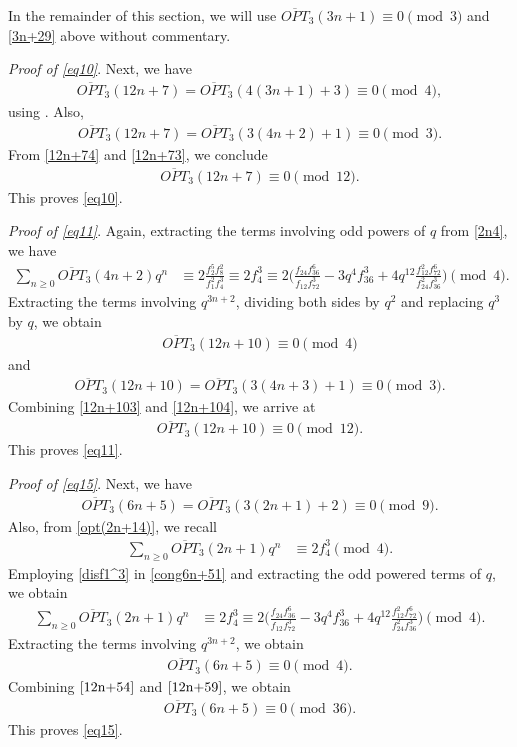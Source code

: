 \documentclass[12pt,reqno]{amsart}
\numberwithin{equation}{section}
\newcommand{\opt}{\overline{OPT}}
\begin{document}
In the remainder of this section, we will use $\opt_3(3n+1) \equiv 0\pmod{3}$ and \eqref{3n+29} above without commentary.

\emph{Proof of \eqref{eq10}}. Next, we have 
\begin{align}
    \opt_3(12n+7) = \opt_3(4(3n+1)+3) \equiv 0 \pmod{4},\label{12n+74}
\end{align}
using \cite[Theorem 1]{SSS}.
Also, 
\begin{align}
    \opt_3(12n+7) = \opt_3(3(4n+2)+1) \equiv 0 \pmod{3}.\label{12n+73}
\end{align}
From \eqref{12n+74} and \eqref{12n+73}, we conclude
\begin{align*}
     \opt_3(12n+7) \equiv 0 \pmod{12}.
\end{align*}
This proves \eqref{eq10}.

\emph{Proof of \eqref{eq11}}. Again, extracting the terms involving odd powers of $q$ from \eqref{2n4}, we have
\begin{align*}
     \sum_{n\geq 0}\opt_3(4n+2)q^n &\equiv 2\frac{f_{2}^5f_{8}^2}{f_{1}^2f_{4}^3}\equiv 2f_{4}^3 \equiv 2\Bigg(\frac{f_{24}f_{36}^6}{f_{12}f_{72}^3}-3q^4f_{36}^3+4q^{12} \frac{f_{12}^2f_{72}^6}{f_{24}^2f_{36}^3}\Bigg) \pmod{4}.
\end{align*}
Extracting the terms involving $q^{3n+2}$, dividing both sides by $q^2$ and replacing $q^3$ by $q$, we obtain
\begin{align}
    \opt_3(12n+10) \equiv 0 \pmod{4}\label{12n+104}
\end{align}
and 
\begin{align}
    \opt_3(12n+10) = \opt_3(3(4n+3)+1) \equiv 0 \pmod{3}. \label{12n+103}
\end{align}
Combining \eqref{12n+103} and \eqref{12n+104}, we arrive at
\begin{align*}
     \opt_3(12n+10) \equiv 0 \pmod{12}.
\end{align*}
This proves \eqref{eq11}.

\emph{Proof of \eqref{eq15}}. Next, we have
\begin{align}
    \opt_3(6n+5) = \opt_3(3(2n+1)+2) \equiv 0 \pmod{9}.\label{12n+59}
\end{align}
Also, from \eqref{opt(2n+14)}, we recall
\begin{align}
     \sum_{n\geq 0}\opt_3(2n+1)q^n &\equiv 2 f_{4}^3 \pmod{4}.\label{cong6n+51}
\end{align}
Employing  \eqref{disf1^3} in \eqref{cong6n+51} and extracting the odd powered terms of $q$, we obtain
\begin{align*}
         \sum_{n\geq 0}\opt_3(2n+1)q^n &\equiv 2 f_{4}^3 \equiv 2 \Bigg(\frac{f_{24}f_{36}^6}{f_{12}f_{72}^3}-3q^4f_{36}^3+4q^{12} \frac{f_{12}^2f_{72}^6}{f_{24}^2f_{36}^3}\Bigg) \pmod{4}.
\end{align*}
Extracting the terms involving $q^{3n+2}$, we obtain
\begin{align}
    \opt_3(6n+5) \equiv 0 \pmod{4}.\label{12n+54}
\end{align}
Combining $\eqref{12n+54}$ and $\eqref{12n+59}$, we obtain
\begin{align*}
    \opt_3(6n+5) \equiv 0 \pmod{36}.
\end{align*}
This proves \eqref{eq15}.
\end{document}

